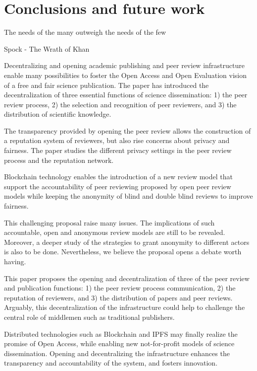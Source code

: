 \chapter{Conclusions and future work}

\begin{FraseCelebre}
  \begin{Frase}
    The needs of the many outweigh the needs of the few
  \end{Frase}
  \begin{Fuente}
    Spock - The Wrath of Khan
  \end{Fuente}
\end{FraseCelebre}

Decentralizing and opening academic publishing and peer review infrastructure
enable many possibilities to foster the Open Access and Open Evaluation vision
of a free and fair science publication. The paper has introduced the
decentralization of three essential functions of science dissemination: 1) the
peer review process, 2) the selection and recognition of peer reviewers, and 3)
the distribution of scientific knowledge.

The transparency provided by opening the peer review allows the construction of
a reputation system of reviewers, but also rise concerns about privacy and
fairness. The paper studies the different privacy settings in the peer review
process and the reputation network.

Blockchain technology enables the introduction of a new review model that
support the accountability of peer reviewing proposed by open peer review models
while keeping the anonymity of blind and double blind reviews to improve
fairness.

This challenging proposal raise many issues. The implications of such
accountable, open and anonymous review models are still to be revealed.
Moreover, a deeper study of the strategies to grant anonymity to different
actors is also to be done. Nevertheless, we believe the proposal opens a debate
worth having.

This paper proposes the opening and decentralization of three of the peer review
and publication functions: 1) the peer review process communication, 2) the
reputation of reviewers, and 3) the distribution of papers and peer reviews.
Arguably, this decentralization of the infrastructure could help to challenge
the central role of middlemen such as traditional publishers.

Distributed technologies such as Blockchain and IPFS may finally realize the
promise of Open Access, while enabling new not-for-profit models of science
dissemination. Opening and decentralizing the infrastructure enhances the
transparency and accountability of the system, and fosters innovation.

